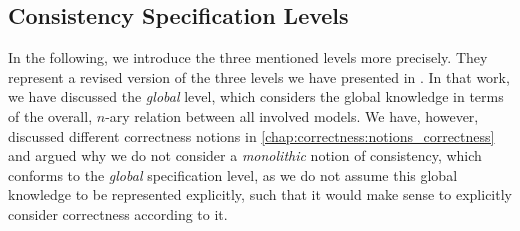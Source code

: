 

\subsection{Consistency Specification Levels}

In the following, we introduce the three mentioned levels more precisely.
They represent a revised version of the three levels we have presented in .
In that work, we have discussed the \emph{global} level, which considers the global knowledge in terms of the overall, $n$-ary relation between all involved models.
We have, however, discussed different correctness notions in \autoref{chap:correctness:notions_correctness} and argued why we do not consider a \emph{monolithic} notion of consistency, which conforms to the \emph{global} specification level, as we do not assume this global knowledge to be represented explicitly, such that it would make sense to explicitly consider correctness according to it.


%    

